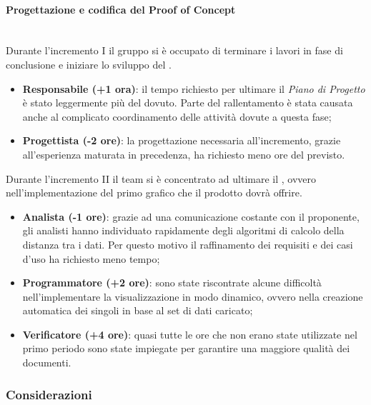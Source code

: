 \paragraph{Progettazione e codifica del Proof of Concept} \mbox{}\\

Durante l'incremento I il gruppo si è occupato di terminare i lavori in fase di conclusione e iniziare lo sviluppo del .

\begin{itemize}
\item \textbf{Responsabile (+1 ora)}: il tempo richiesto per ultimare il \textit{Piano di Progetto} è stato leggermente più del dovuto. Parte del rallentamento è stata causata anche al complicato coordinamento delle attività dovute a questa fase;

\item \textbf{Progettista (-2 ore)}: la progettazione necessaria all'incremento, grazie all'esperienza maturata in precedenza, ha richiesto meno ore del previsto.

\end{itemize}

Durante l'incremento II il team si è concentrato ad ultimare il , ovvero nell'implementazione del primo grafico che il prodotto dovrà offrire.

\begin{itemize}
\item \textbf{Analista (-1 ore)}: grazie ad una comunicazione costante con il proponente, gli analisti hanno individuato rapidamente degli algoritmi di calcolo della distanza tra i dati. Per questo motivo il raffinamento dei requisiti e dei casi d'uso ha richiesto meno tempo;

\item \textbf{Programmatore (+2 ore)}: sono state riscontrate alcune difficoltà nell'implementare la visualizzazione  in modo dinamico, ovvero nella creazione automatica dei singoli  in base al set di dati caricato;

\item \textbf{Verificatore (+4 ore)}: quasi tutte le ore che non erano state utilizzate nel primo periodo sono state impiegate per garantire una maggiore qualità dei documenti.
\end{itemize}

\subsubsection{Considerazioni}

